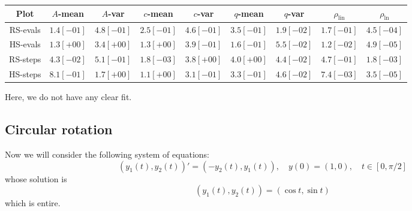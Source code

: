 \begin{table}[H]
    \centering
    \small
    \begin{tabular}{c||c|c|c|c|c|c|c|c}
Plot & \(A\)-mean & \(A\)-var & \(c\)-mean & \(c\)-var & \(q\)-mean & \(q\)-var & \(\rho_{\operatorname{lin}}\) & \(\rho_{\ln}\)\\\hline
\rowcolor{red}
RS-evals & \(1.4[-01]\) & \(4.8[-01]\) & \(2.5[-01]\) & \(4.6[-01]\) & \(3.5[-01]\) & \(1.9[-02]\) & \(1.7[-01]\) & \(4.5[-04]\) \\
\rowcolor{red}
HS-evals & \(1.3[+00]\) & \(3.4[+00]\) & \(1.3[+00]\) & \(3.9[-01]\) & \(1.6[-01]\) & \(5.5[-02]\) & \(1.2[-02]\) & \(4.9[-05]\) \\
\rowcolor{red}
RS-steps & \(4.3[-02]\) & \(5.1[-01]\) & \(1.8[-03]\) & \(3.8[+00]\) & \(4.0[+00]\) & \(4.4[-02]\) & \(4.7[-01]\) & \(1.8[-03]\) \\
\rowcolor{red}
HS-steps & \(8.1[-01]\) & \(1.7[+00]\) & \(1.1[+00]\) & \(3.1[-01]\) & \(3.3[-01]\) & \(4.6[-02]\) & \(7.4[-03]\) & \(3.5[-05]\) \\
    \end{tabular}
    \label{tab:my_label}
\end{table}

Here, we do not have any clear fit.

\subsection{Circular rotation}

Now we will consider the following system of equations:
\begin{equation}\label{48}
(y_1(t),y_2(t))' = (-y_2(t), y_1(t)), \quad y(0) = (1,0), \quad t\in [0,\pi /2]
\end{equation}
whose solution is 
\[
(y_1(t),y_2(t)) = (\cos t, \sin t)
\]
which is entire.

